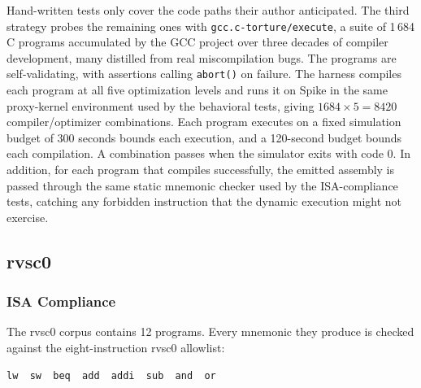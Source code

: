 Hand-written tests only cover the code paths their author anticipated. The third strategy probes the
remaining ones with \texttt{gcc.c-torture/execute}, a suite of 1\,684 C programs accumulated by the
GCC project over three decades of compiler development, many distilled from real miscompilation bugs.
The programs are self-validating, with assertions calling \texttt{abort()} on failure. The harness
compiles each program at all five optimization levels and runs it on Spike in the same proxy-kernel
environment used by the behavioral tests, giving $1684 \times 5 = 8420$ compiler/optimizer
combinations. Each program executes on a fixed simulation budget of 300 seconds bounds each
execution, and a 120-second budget bounds each compilation. A combination passes when the simulator
exits with code 0. In addition, for each program that compiles successfully, the emitted assembly is
passed through the same static mnemonic checker used by the ISA-compliance tests, catching any
forbidden instruction that the dynamic execution might not exercise.

\subsection{rvsc0}

\subsubsection{ISA Compliance} \label{sec:sc0-isa-tests}

The rvsc0 corpus contains 12 programs. Every mnemonic they produce is checked against the
eight-instruction rvsc0 allowlist:

\begin{lstlisting}
lw  sw  beq  add  addi  sub  and  or
\end{lstlisting}

